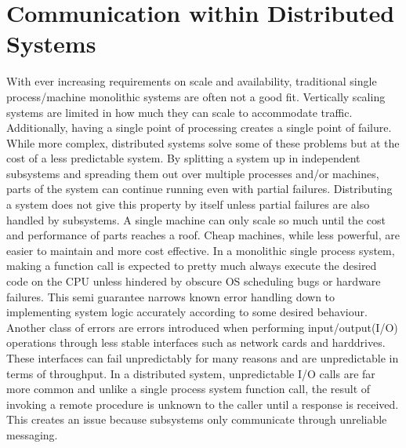 \documentclass[11pt]{article}
\begin{document}
\clearpage

\tableofcontents
\clearpage
\section{Communication within Distributed Systems}
With ever increasing requirements on scale and availability, traditional single process/machine monolithic systems are often not a good fit. Vertically scaling systems are limited in how much they can scale to accommodate traffic. Additionally, having a single point of processing creates a single point of failure. While more complex, distributed systems solve some of these problems but at the cost of a less predictable system.
\newline
\newline
By splitting a system up in independent subsystems and spreading them out over multiple processes and/or machines, parts of the system can continue running even with partial failures. Distributing a system does not give this property by itself unless partial failures are also handled by subsystems. A single machine can only scale so much until the cost and performance of parts reaches a roof. Cheap machines, while less powerful, are easier to maintain and more cost effective.
\newline
\newline
In a monolithic single process system, making a function call is expected to pretty much always execute the desired code on the CPU unless hindered by obscure OS scheduling bugs or hardware failures. This semi guarantee narrows known error handling down to implementing system logic accurately according to some desired behaviour.
\newline
\newline
Another class of errors are errors introduced when performing input/output(I/O) operations through less stable interfaces such as network cards and harddrives. These interfaces can fail unpredictably for many reasons and are unpredictable in terms of throughput.
\newline
\newline
In a distributed system, unpredictable I/O calls are far more common and unlike a single process system function call, the result of invoking a remote procedure is unknown to the caller until a response is received. This creates an issue because subsystems only communicate through unreliable messaging.
\end{document}
